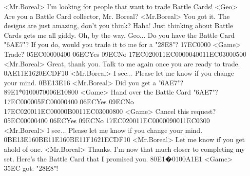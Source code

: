 <Mr.Boreal> I'm looking for people that want to trade Battle Cards! 
<Geo> Are you a Battle Card collector, Mr. Boreal? 
<Mr.Boreal> You got it. 
The designs are just amazing, don't you think? 
Haha! 
Just thinking about Battle Cards gets me all giddy. 
Oh, by the way, Geo... 
Do you have the Battle Card "{6A}{E7}"? 
If you do, would you trade it to me for a "{28}{E8}"? 
{17}{EC}{00}{00} 
<Game> Trade? {05}{EC}{00}{00}{04}{00}  {06}{EC}Yes   {09}{EC}No 
{17}{EC}{02}{00}{11}{EC}{00}{00}{04}{00}{11}{EC}{03}{00}{05}{00}
<Mr.Boreal> Great, thank you. 
Talk to me again once you are ready to trade. 
{0A}{E1}{1E}{16}{20}{EC}{DF}{10}
<Mr.Boreal> I see... Please let me know if you change your mind. 
{0B}{E1}{3E}{16}
<Mr.Boreal> Did you get a "{6A}{E7}"? 
{89}{E1}*{01}{00}{07}{00}{06}{E1}{08}{00}
<Game> Hand over the Battle Card "{6A}{E7}"? 
{17}{EC}{00}{00}{05}{EC}{00}{00}{04}{00}  {06}{EC}Yes   {09}{EC}No 
{17}{EC}{02}{00}{11}{EC}{00}{00}{0B}{00}{11}{EC}{03}{00}{08}{00}
<Game> Cancel this request? {05}{EC}{00}{00}{04}{00}  {06}{EC}Yes   {09}{EC}No 
{17}{EC}{02}{00}{11}{EC}{00}{00}{09}{00}{11}{EC}{03}{00}
<Mr.Boreal> I see... Please let me know if you change your mind. 
{0B}{E1}{3E}{16}{0B}{E1}{1E}{16}{0B}{E1}{1F}{16}{21}{EC}{DF}{10}
<Mr.Boreal> Let me know if you get ahold of one. 
<Mr.Boreal> Thanks. 
I'm now that much closer to completing my set. 
Here's the Battle Card that I promised you. 
{80}{E1}�{01}{00}{A1}{E1} 
<Game> {35}{EC} got: "{28}{E8}"! 
